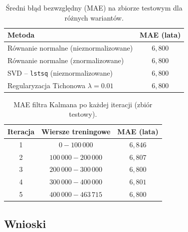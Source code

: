 \documentclass[12pt, a4paper]{article}
\begin{document}
\begin{table}[H]
  \centering
  \caption{Średni błąd bezwzględny (MAE) na zbiorze testowym dla różnych wariantów.}
  \begin{tabular}{lc}
    \toprule
    Metoda & MAE (lata) \\
    \midrule
    Równanie normalne (nieznormalizowane)  & $6{,}800$ \\
    Równanie normalne (znormalizowane)     & $6{,}800$ \\
    SVD -- \texttt{lstsq} (nieznormalizowane) & $6{,}800$ \\
    Regularyzacja Tichonowa $\lambda=0.01$ & $6{,}800$ \\
    \bottomrule
  \end{tabular}
  \label{tab:mae}
\end{table}

\begin{table}[H]
  \centering
  \caption{MAE filtra Kalmana po każdej iteracji (zbiór testowy).}
  \begin{tabular}{ccc}
    \toprule
    Iteracja & Wiersze treningowe & MAE (lata) \\
    \midrule
    1 & $0      - 100\,000$          & $6{,}846$ \\
    2 & $100\,000 - 200\,000$        & $6{,}807$ \\
    3 & $200\,000 - 300\,000$        & $6{,}800$ \\
    4 & $300\,000 - 400\,000$        & $6{,}801$ \\
    5 & $400\,000 - 463\,715$        & $6{,}800$ \\
    \bottomrule
  \end{tabular}
  \label{tab:kalman}
\end{table}

\subsection{Wnioski}
\end{document}
